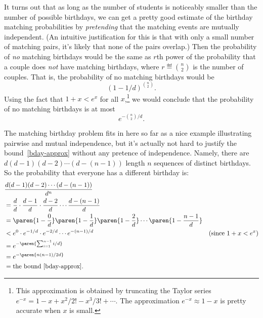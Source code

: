 \iffalse
We could justify all these assertions of independence using the four
step method, but it's pretty boring, and we'll skip it.
\fi

It turns out that as long as the number of students is noticeably
smaller than the number of possible birthdays, we can get a pretty
good estimate of the birthday matching probabilities by
\emph{pretending} that the matching events are mutually independent.
(An intuitive justification for this is that with only a small number
of matching pairs, it's likely that none of the pairs overlap.)  Then
the probability of \emph{no} matching birthdays would be the same as
$r$th power of the probability that a couple does \emph{not} have
matching birthdays, where $r \eqdef \binom{n}{2}$ is the number of
couples.  That is, the probability of no matching birthdays would be
\begin{equation}\label{11dbinn2}
(1-1/d)^{\binom{n}{2}}.
\end{equation}
Using the fact that $1+x < e^x$ for all $x$,\footnote{This
  approximation is obtained by truncating the Taylor series $e^{-x} =
  1 - x + x^2/2!  - x^3/3! + \cdots$.  The approximation $e^{-x}
  \approx 1 - x$ is pretty accurate when $x$ is small.} we would conclude
that the probability of no matching birthdays is at most
\begin{equation}\label{bday-approx}
e^{-\binom{n}{2}/d}.
\end{equation}

The matching birthday problem fits in here so far as a nice example
illustrating pairwise and mutual independence, but it's actually not
hard to justify the bound~\eqref{bday-approx} without any pretence of
independence.  Namely, there are $d (d - 1) (d - 2) \cdots (d - (n -
1))$ length $n$ sequences of distinct birthdays.  So the probability
that everyone has a different birthday is:
\begin{align*}
\lefteqn{\frac{d (d - 1) (d - 2) \cdots (d - (n - 1))}{d^n}}\\
   & = \frac{d}{d} \cdot \frac{d-1}{d} \cdot \frac{d-2}{d} \cdots \frac{d - (n - 1)}{d}\\
   & = \paren{1 - \frac{0}{d}}
             \paren{1 - \frac{1}{d}}
             \paren{1 - \frac{2}{d}}
             \cdots
             \paren{1 - \frac{n - 1}{d}}\\
   & < e^0 \cdot e^{-1/d} \cdot e^{-2/d} \cdots e^{-(n-1)/d} 
             & \text{(since $1+x < e^x$)} \\
   & = e^{-\paren{\sum_{i=1}^{n-1} i/d}}\\
   & = e^{-\paren{n(n-1)/2d}}\\
   & = \text{the bound~\eqref{bday-approx}}.
\end{align*}

